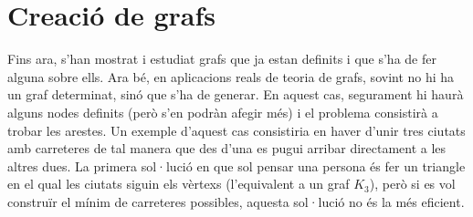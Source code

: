 \documentclass[catalan, a4, 12pt]{article}
\begin{document}
\part{Creació de grafs}
Fins ara, s'han mostrat i estudiat grafs que ja estan definits i que s'ha de fer alguna sobre ells. Ara bé, en aplicacions reals de teoria de grafs, sovint no hi ha un graf determinat, sinó que s'ha de generar. En aquest cas, segurament hi haurà alguns nodes definits (però s'en podràn afegir més) i el problema consistirà a trobar les arestes. Un exemple d'aquest cas consistiria en haver d'unir tres ciutats amb carreteres de tal manera que des d'una es pugui arribar directament a les altres dues. La primera sol·lució en que sol pensar una persona és fer un triangle en el qual les ciutats siguin els vèrtexs (l'equivalent a un graf $K_{3}$), però si es vol construïr el mínim de carreteres possibles, aquesta sol·lució no és la més eficient.
\end{document}

